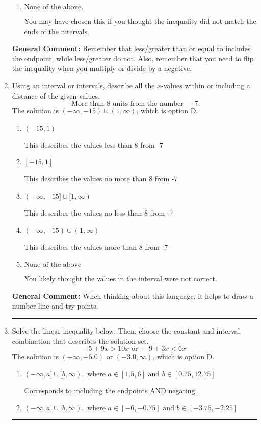 \documentclass{extbook}[14pt]
\newcommand{\litem}[1]{\item #1

\rule{\textwidth}{0.4pt}}
\begin{document}
\begin{enumerate}
{\begin{enumerate}[label=\Alph*.]
 $(-\infty, -2.349]$, which corresponds to negating the endpoint of the solution.
\item \( \text{None of the above}. \)

You may have chosen this if you thought the inequality did not match the ends of the intervals.
\end{enumerate}

\textbf{General Comment:} Remember that less/greater than or equal to includes the endpoint, while less/greater do not. Also, remember that you need to flip the inequality when you multiply or divide by a negative.
}
\litem{
Using an interval or intervals, describe all the $x$-values within or including a distance of the given values.
\[ \text{ More than } 8 \text{ units from the number } -7. \]The solution is \( (-\infty, -15) \cup (1, \infty) \), which is option D.\begin{enumerate}[label=\Alph*.]
\item \( (-15, 1) \)

This describes the values less than 8 from -7
\item \( [-15, 1] \)

This describes the values no more than 8 from -7
\item \( (-\infty, -15] \cup [1, \infty) \)

This describes the values no less than 8 from -7
\item \( (-\infty, -15) \cup (1, \infty) \)

This describes the values more than 8 from -7
\item \( \text{None of the above} \)

You likely thought the values in the interval were not correct.
\end{enumerate}

\textbf{General Comment:} When thinking about this language, it helps to draw a number line and try points.
}
\litem{
Solve the linear inequality below. Then, choose the constant and interval combination that describes the solution set.
\[ -5 + 9 x > 10 x \text{ or } -9 + 3 x < 6 x \]The solution is \( (-\infty, -5.0) \text{ or } (-3.0, \infty) \), which is option D.\begin{enumerate}[label=\Alph*.]
\item \( (-\infty, a] \cup [b, \infty), \text{ where } a \in [1.5, 6] \text{ and } b \in [0.75, 12.75] \)

Corresponds to including the endpoints AND negating.
\item \( (-\infty, a] \cup [b, \infty), \text{ where } a \in [-6, -0.75] \text{ and } b \in [-3.75, -2.25] \)


\end{enumerate}}
\end{enumerate}
\end{document}
